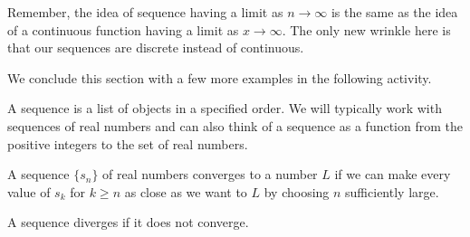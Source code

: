 
Remember, the idea of sequence having a limit as $n \to \infty$ is the same as the idea of a continuous function having a limit as $x \to \infty$. The only new wrinkle here is that our sequences are discrete instead of continuous.

We conclude this section with a few more examples in the following activity.


\begin{summary}
\item A sequence is a list of objects in a specified order. We will typically work with sequences of real numbers and can also think of a sequence as a function from the positive integers to the set of real numbers.
\item A sequence $\{s_n\}$ of real numbers converges to a number $L$ if we can make every value of  $s_k$ for $k \ge n$ as close as we want to $L$ by choosing $n$ sufficiently large.
\item A sequence diverges if it does not converge.
\end{summary}
